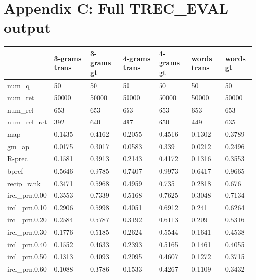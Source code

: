 \documentclass[jair, twoside,11pt,theapa]{article}
\begin{document}
\section*{Appendix C: Full TREC\_EVAL output} 
\begin{table}[h!]
\begin{tabular}{|l|l|l|l|l|l|l|}
\hline
               & 3-grams trans & 3-grams gt & 4-grams trans & 4-grams gt & words trans & words gt \\ \hline
num\_q         & 50        & 50       & 50        & 50        & 50        & 50       \\ \hline
num\_ret       & 50000     & 50000    & 50000     & 50000     & 50000     & 50000    \\ \hline
num\_rel       & 653       & 653      & 653       & 653       & 653       & 653      \\ \hline
num\_rel\_ret  & 392       & 640      & 497       & 650       & 449       & 635      \\ \hline
map            & 0.1435    & 0.4162   & 0.2055    & 0.4516    & 0.1302    & 0.3789   \\ \hline
gm\_ap         & 0.0175    & 0.3017   & 0.0583    & 0.339     & 0.0212    & 0.2496   \\ \hline
R-prec         & 0.1581    & 0.3913   & 0.2143    & 0.4172    & 0.1316    & 0.3553   \\ \hline
bpref          & 0.5646    & 0.9785   & 0.7407    & 0.9973    & 0.6417    & 0.9665   \\ \hline
recip\_rank    & 0.3471    & 0.6968   & 0.4959    & 0.735     & 0.2818    & 0.676    \\ \hline
ircl\_prn.0.00 & 0.3553    & 0.7339   & 0.5168    & 0.7625    & 0.3048    & 0.7134   \\ \hline
ircl\_prn.0.10 & 0.2906    & 0.6998   & 0.4051    & 0.6912    & 0.241     & 0.6264   \\ \hline
ircl\_prn.0.20 & 0.2584    & 0.5787   & 0.3192    & 0.6113    & 0.209     & 0.5316   \\ \hline
ircl\_prn.0.30 & 0.1776    & 0.5185   & 0.2624    & 0.5544    & 0.1641    & 0.4538   \\ \hline
ircl\_prn.0.40 & 0.1552    & 0.4633   & 0.2393    & 0.5165    & 0.1461    & 0.4055   \\ \hline
ircl\_prn.0.50 & 0.1313    & 0.4093   & 0.2095    & 0.4607    & 0.1272    & 0.3715   \\ \hline
ircl\_prn.0.60 & 0.1088    & 0.3786   & 0.1533    & 0.4267    & 0.1109    & 0.3432   \\ \hline

\end{tabular}
\end{table}
\end{document}
